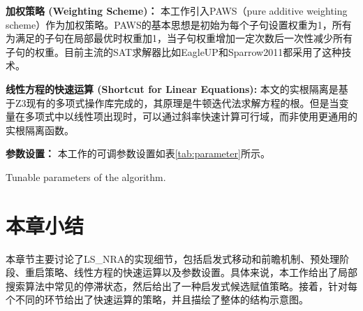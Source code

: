\textbf{加权策略 (Weighting Scheme)：} 本工作引入PAWS（pure additive weighting scheme）\cite{PAWS}作为加权策略。PAWS的基本思想是初始为每个子句设置权重为1，所有为满足的子句在局部最优时权重加1，当子句权重增加一定次数后一次性减少所有子句的权重。目前主流的SAT求解器比如EagleUP\cite{eagleup}和Sparrow2011\cite{sparrow}都采用了这种技术。

\textbf{线性方程的快速运算 (Shortcut for Linear Equations):} 本文的实根隔离是基于Z3现有的多项式操作库完成的，其原理是牛顿迭代法求解方程的根。但是当变量在多项式中以线性项出现时，可以通过斜率快速计算可行域，而非使用更通用的实根隔离函数。

\textbf{参数设置：} 本工作的可调参数设置如表\ref{tab:parameter}所示。

\begin{table}[]
    \centering
     {Tunable parameters of the algorithm.}
\label{tab:parameter}
\end{table}

\section{本章小结}
本章节主要讨论了LS\_NRA的实现细节，包括启发式移动和前瞻机制、预处理阶段、重启策略、线性方程的快速运算以及参数设置。具体来说，本工作给出了局部搜索算法中常见的停滞状态，然后给出了一种启发式候选赋值策略。接着，针对每个不同的环节给出了快速运算的策略，并且描绘了整体的结构示意图。